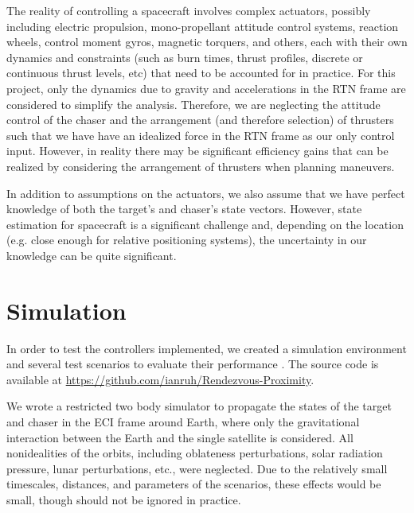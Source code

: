 \documentclass[conference]{IEEEtran}
\begin{document}
The reality of controlling a spacecraft involves complex actuators, possibly
including electric propulsion, mono-propellant attitude control systems,
reaction wheels, control moment gyros, magnetic torquers, and others, each with
their own dynamics and constraints (such as burn times, thrust profiles,
discrete or continuous thrust levels, etc) that need to be accounted for in
practice. For this project, only the dynamics due to gravity and accelerations
in the RTN frame are considered to simplify the analysis. Therefore, we are
neglecting the attitude control of the chaser and the arrangement (and
therefore selection) of thrusters such that we have have an idealized force in
the RTN frame as our only control input. However, in reality there may be
significant efficiency gains that can be realized by considering the
arrangement of thrusters when planning maneuvers.

In addition to assumptions on the actuators, we also assume that we have
perfect knowledge of both the target's and chaser's state vectors. However,
state estimation for spacecraft is a significant challenge and, depending on
the location (e.g. close enough for relative positioning systems), the
uncertainty in our knowledge can be quite significant.


\section{Simulation}

In order to test the controllers implemented, we created a simulation
environment and several test scenarios to evaluate their performance
\cite{rpo_repo}. The source code is available at
\url{https://github.com/ianruh/Rendezvous-Proximity}.

We wrote a restricted two body simulator to propagate the states of the target
and chaser in the ECI frame around Earth, where only the gravitational
interaction between the Earth and the single satellite is considered. All
nonidealities of the orbits, including oblateness perturbations, solar
radiation pressure, lunar perturbations, etc., were neglected. Due to the
relatively small timescales, distances, and parameters of the scenarios, these
effects would be small, though should not be ignored in practice.
\end{document}
